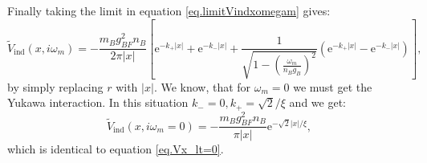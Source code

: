 Finally taking the limit in equation \eqref{eq.limitVindxomegam} gives:
\begin{equation}
\tilde{V}_{\text{ind}}(x, i\omega_m) = -\frac{m_Bg^2_{BF}n_B}{2\pi |x|}\left[ \text{e}^{-k_+|x|} + \text{e}^{-k_-|x|}  + \frac{1}{ \sqrt{1 - \left(\frac{\omega_m}{n_Bg_B}\right)^2} }\left(\text{e}^{-k_+|x|} - \text{e}^{-k_-|x|}  \right) \right], 
\end{equation}
by simply replacing $r$ with $|x|$. We know, that for $\omega_m = 0$ we must get the Yukawa interaction. In this situation $k_- = 0, k_+ = \sqrt{2}/\xi$ and we get:
\begin{equation}
\tilde{V}_{\text{ind}}(x, i\omega_m = 0) = -\frac{m_Bg^2_{BF}n_B}{\pi |x|}\text{e}^{-\sqrt{2}|x|/\xi}, \nonumber
\end{equation}
which is identical to equation \eqref{eq.Vx_lt=0}. 

